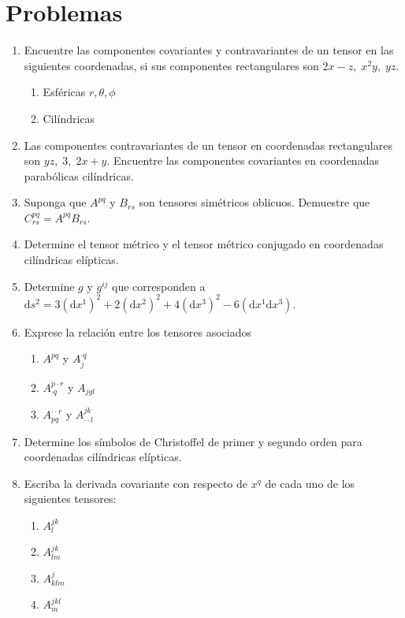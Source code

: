 \documentclass{modernhandout}
\begin{document}
\section*{Problemas}
\begin{enumerate}
    \item Encuentre las componentes covariantes y contravariantes de un tensor en las siguientes coordenadas, si sus componentes rectangulares son $2x-z,\;x^2y,\;yz$.
    \begin{enumerate}
        \item Esféricas $r,\theta,\phi$
        \item Cilíndricas
    \end{enumerate}
    \item Las componentes contravariantes de un tensor en coordenadas rectangulares son $yz,\;3,\;2x+y$. Encuentre las componentes covariantes en coordenadas parabólicas cilíndricas.
    \item Suponga que $A^{pq}$ y $B_{rs}$ son tensores simétricos oblicuos. Demuestre que $C_{rs}^{pq}=A^{pq}B_{rs}$.
    \item Determine el tensor métrico y el tensor métrico conjugado en coordenadas cilíndricas elípticas.
    \item Determine $g$ y $g^{ij}$ que corresponden a $\mathrm{d}s^2=3\left(\mathrm{d}x^1\right)^2+2\left(\mathrm{d}x^2\right)^2+4\left(\mathrm{d}x^3\right)^2-6\left(\mathrm{d}x^1\mathrm{d}x^3\right)$.
    \item Exprese la relación entre los tensores asociados
    \begin{enumerate}
        \item $A^{pq}$ y $A^{\cdot q}_{j}$
        \item $A^{p\cdot r}_{\cdot q}$ y $A_{jgl}$
        \item $A^{\cdot\cdot r}_{pq}$ y $A^{jk}_{\cdot\cdot l}$
    \end{enumerate}
    \item Determine los símbolos de Christoffel de primer y segundo orden para coordenadas cilíndricas elípticas.
    \item Escriba la derivada covariante con respecto de $x^q$ de cada uno de los siguientes tensores:
    \begin{enumerate}
        \item $A^{jk}_{l}$
        \item $A^{jk}_{lm}$
        \item $A^{j}_{klm}$
        \item $A^{jkl}_{m}$

\end{enumerate}
\end{enumerate}
\end{document}
